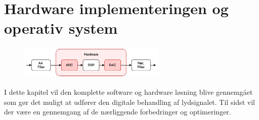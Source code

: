 \chapter{Hardware implementeringen og operativ system}\label{kap:hardware}

\begin{figure}[h]
	\vspace*{-1 cm}
	\includegraphics[width=7cm]{billeder/flow_hardware}
	\vspace{0.5 cm}
\end{figure}

I dette kapitel vil den komplette software og hardware løsning blive gennemgået som gør det muligt at udfører den digitale behandling af lydsignalet.
Til sidst vil der være en gennemgang af de nærliggende forbedringer og optimeringer.


%	






